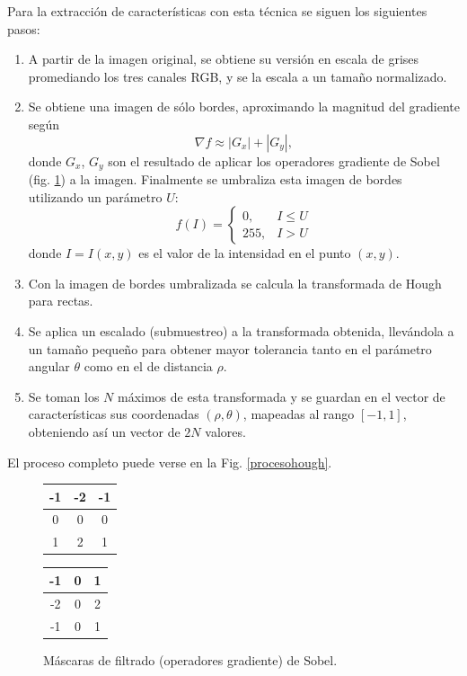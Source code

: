 \documentclass[conference,a4paper,10pt,oneside,final]{tfmpd}
\begin{document}
Para la extracción de características con esta técnica se siguen los siguientes
pasos:
\begin{enumerate}
\item A partir de la imagen original, se obtiene su versión en escala de grises
      promediando los tres canales RGB, y se la escala a un tamaño normalizado.
\item Se obtiene una imagen de sólo bordes, aproximando la magnitud del
      gradiente según
      \begin{equation}
      \label{sob}
      \nabla f \approx |G_x| + |G_y|,
      \end{equation}
      donde $G_x$, $G_y$ son el resultado de aplicar los o\-pe\-ra\-do\-res
      gradiente  de Sobel \cite{gonzalez+woods} (fig. \ref{masksobel}) a la
      imagen.
      Finalmente se umbraliza esta imagen de bordes utilizando un parámetro $U$:
      \begin{equation}
      \label{umbral}
      f(I)=
      \begin{cases}
      0, & I\leq U\\
      255, & I > U
      \end{cases}
      \end{equation}
      {donde $I=I(x,y)$ es el valor de la intensidad en el punto $(x,y)$.}
\item Con la imagen de bordes umbralizada se calcula la trans\-forma\-da de
      Hough para rectas.
\item Se aplica un escalado (submuestreo) a la transformada obtenida, llevándola
      a un tamaño pequeño
      para obtener mayor tolerancia tanto en el parámetro angular
      $\theta$ como en el de distancia $\rho$.
\item Se toman los $N$ máximos de esta transformada y se guardan en el vector de
      características sus coordenadas $(\rho,\theta)$, mapeadas al rango
      $[-1,1]$, obteniendo así un vector de $2N$ valores.
\end{enumerate}
El proceso completo puede verse en la Fig. \ref{procesohough}.
\begin{figure}
\begin{center}
\begin{tabular}{|c|c|c|}
\hline -1 & -2 & -1 \\\hline 0 & 0 & 0 \\\hline 1 & 2 & 1 \\\hline
\end{tabular}
\begin{tabular}{|c|c|c|}
\hline -1 & 0 & 1 \\\hline -2 & 0 & 2 \\\hline -1 & 0 & 1 \\\hline
\end{tabular}
\end{center}
\caption{Máscaras de filtrado (operadores gradiente) de Sobel.}
\label{masksobel}
\end{figure}
\end{document}
